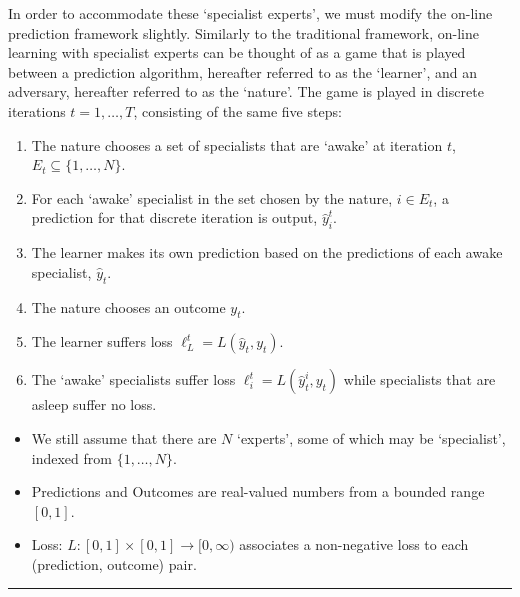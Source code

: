 In order to accommodate these `specialist experts', we must modify the on-line prediction framework slightly. Similarly to the traditional framework, on-line learning with specialist experts can be thought of as a game that is played between a prediction algorithm, hereafter referred to as the `learner', and an adversary, hereafter referred to as the `nature'. The game is played in discrete iterations $t = 1, \ldots, T$, consisting of the same five steps:
\begin{enumerate}
    \item The nature chooses a set of specialists that are `awake' at iteration $t$, $E_t \subseteq \{1, \ldots, N\}$.
    \item For each `awake' specialist in the set chosen by the nature, $i \in E_t$, a prediction for that discrete iteration is output, $\hat y^t_i$.
    \item The learner makes its own prediction based on the predictions of each awake specialist, $\hat y_t$.
    \item The nature chooses an outcome $y_t$.
    \item The learner suffers loss $\ell_L^t = L(\hat y_t, y_t)$.
    \item The `awake' specialists suffer loss $\ell_i^t = L(\hat y^i_t, y_t)$ while specialists that are asleep suffer no loss.
\end{enumerate}
\begin{itemize}
    \item We still assume that there are $N$ `experts', some of which may be `specialist', indexed from $\{1, \ldots, N\}$.
    \item Predictions and Outcomes are real-valued numbers from a bounded range $[0, 1]$.
    \item Loss: $L : [0,1] \times [0,1] \rightarrow [0, \infty)$ associates a non-negative loss to each (prediction, outcome) pair.
\end{itemize}

\noindent\rule{\textwidth}{0.1pt}
